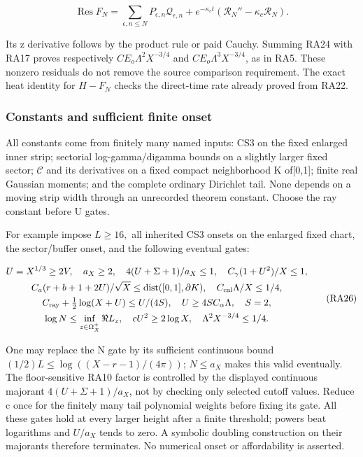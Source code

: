 \[
\operatorname{Res}F_N=\sum_{\epsilon,n\le N}
 P_{\epsilon,n}\mathcal Q_{\epsilon,n}
 +e^{-\kappa_ct}(\mathcal R_N''-\kappa_c\mathcal R_N).
\tag{RA25}\label{eq:ansatz-ra25}
\]

Its z derivative follows by the product rule or paid Cauchy. Summing RA24 with RA17 proves respectively \(C E_{o} \Lambda^{2} X^{-3/4}\) and \(C E_{o} \Lambda^{3} X^{-3/4}\), as in RA5. These nonzero residuals do not remove the source comparison requirement. The exact heat identity for \(H-F_{N}\) checks the direct-time rate already proved from RA22.

\subsubsection{Constants and sufficient finite onset}
\label{subsec:ra-7}

All constants come from finitely many named inputs: CS3 on the fixed enlarged inner strip; sectorial log-gamma/digamma bounds on a slightly larger fixed sector; $\mathcal C$ and its derivatives on a fixed compact neighborhood K of[0,1]; finite real Gaussian moments; and the complete ordinary Dirichlet tail. None depends on a moving strip width through an unrecorded theorem constant. Choose the ray constant before U gates.

For example impose \(L\ge 16,\) all inherited CS3 onsets on the enlarged fixed chart, the sector/buffer onset, and the following eventual gates:

\[
\begin{gathered}
U=X^{1/3}\ge2V,\quad a_X\ge2,\quad
4(U+\Sigma+1)/a_X\le1,\quad C_\gamma(1+U^2)/X\le1,\\
C_a(r+b+1+2U)/\sqrt X\le\operatorname{dist}([0,1],\partial K),
\quad C_{\rm cal}\Lambda/X\le1/4,\\
C_{\rm ray}+\tfrac12\log(X+U)\le U/(4S),\quad
U\ge4S C_\alpha\Lambda,\quad S=2,\\
\log N\le\inf_{z\in\Omega_X^+}\Re L_z,\quad
cU^2\ge2\log X,\quad\Lambda^2X^{-3/4}\le1/4.
\end{gathered}
\tag{RA26}\label{eq:ansatz-ra26}
\]

One may replace the N gate by its sufficient continuous bound \((1/2)L\le \log((X-r-1)/(4\pi))\); \(N\le a_{X}\) makes this valid eventually. The floor-sensitive RA10 factor is controlled by the displayed continuous majorant \(4(U+\Sigma+1)/a_{X}\), not by checking only selected cutoff values. Reduce c once for the finitely many tail polynomial weights before fixing its gate. All these gates hold at every larger height after a finite threshold; powers beat logarithms and \(U/a_{X}\) tends to zero. A symbolic doubling construction on their majorants therefore terminates. No numerical onset or affordability is asserted.

